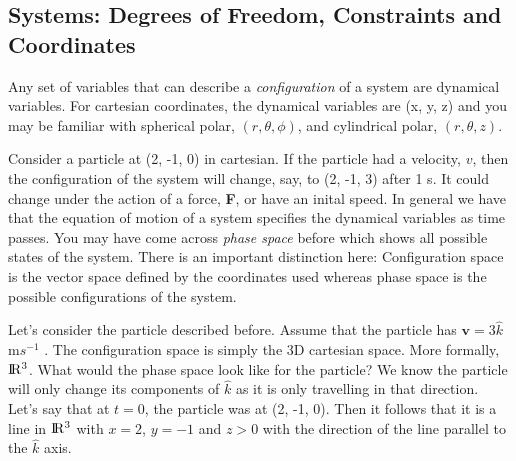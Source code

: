 \subsection{Systems: Degrees of Freedom, Constraints and Coordinates}
Any set of variables that can describe a \textit{configuration} of a system are dynamical variables. For cartesian coordinates, the dynamical variables are (x, y, z) and you may be familiar with spherical polar, $(r, \theta, \phi)$, and cylindrical polar, $(r, \theta, z)$. \par
Consider a particle at (2, -1, 0) in cartesian. If the particle had a velocity, $v$, then the configuration of the system will change, say, to (2, -1, 3) after 1 s. It could change under the action of a force, \textbf{F}, or have an inital speed. In general we have that the equation of motion of a system specifies the dynamical variables as time passes. You may have come across \textit{phase space} before which shows all possible states of the system. There is an important distinction here: Configuration space is the vector space defined by the coordinates used whereas phase space is the possible configurations of the system. \par

Let's consider the particle described before. Assume that the particle has $\textbf{v} = 3\hat{k}$ m$s^{-1}$ . The configuration space is simply the 3D cartesian space. More formally, $\rm I\!R^{3}$. What would the phase space look like for the particle? We know the particle will only change its components of $\hat{k}$ as it is only travelling in that direction. Let's say that at $t=0$, the particle was at (2, -1, 0). Then it follows that it is a line in $\rm I\!R^{3}$ with $x=2$, $y=-1$ and $z>0$ with the direction of the line parallel to the $\hat{k}$ axis.\par

